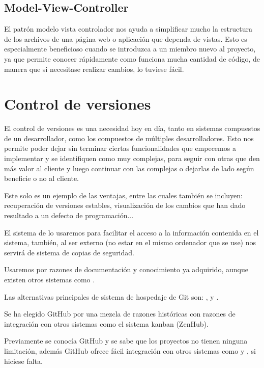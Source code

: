 \subsection{Model-View-Controller}

El patrón modelo vista controlador nos ayuda a simplificar mucho la estructura de los archivos de una página web o aplicación que dependa de vistas. Esto es especialmente beneficioso cuando se introduzca a un miembro nuevo al proyecto, ya que permite conocer rápidamente como funciona mucha cantidad de código, de manera que si necesitase realizar cambios, lo tuviese fácil.


\section{Control de versiones}

El control de versiones es una necesidad hoy en día, tanto en sistemas compuestos de un desarrollador, como los compuestos de múltiples desarrolladores. Esto nos permite poder dejar sin terminar ciertas funcionalidades que empecemos a implementar y se identifiquen como muy complejas, para seguir con otras que den más valor al cliente y luego continuar con las complejas o dejarlas de lado según beneficie o no al cliente.

Este solo es un ejemplo de las ventajas, entre las cuales también se incluyen: recuperación de versiones estables, visualización de los cambios que han dado resultado a un defecto de programación...

El sistema de  lo usaremos para facilitar el acceso a la información contenida en el sistema, también, al ser externo (no estar en el mismo ordenador que se use) nos servirá de sistema de copias de seguridad.

Usaremos  por razones de documentación y conocimiento ya adquirido, aunque existen otros sistemas como .

Las alternativas principales de sistema de hospedaje de Git son: ,  y .

Se ha elegido GitHub por una mezcla de razones históricas con razones de integración con otros sistemas como el sistema kanban (ZenHub).

Previamente se conocía GitHub y se sabe que los proyectos  no tienen ninguna limitación, además GitHub ofrece fácil integración con otros sistemas como  y , si hiciese falta.


